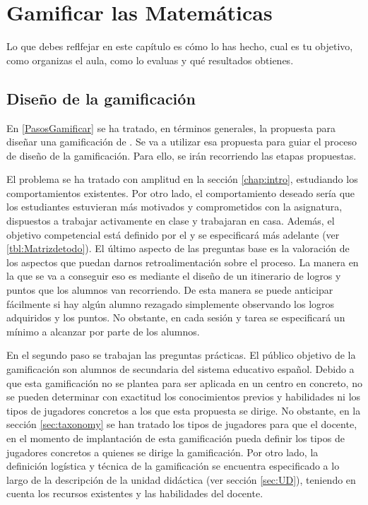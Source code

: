 
\newcommand{\arab}{al-Karaji}
\newcommand{\Arab}{Al-Karaji}
\newcommand{\logro}[2]{\labeltext{#1\xspace}{logro::#2} #1\xspace}


\chapter{Gamificar las Matemáticas}

Lo que debes reflfejar en este capítulo es cómo lo has hecho, cual es tu objetivo, como organizas el aula, como lo evaluas y qué resultados obtienes.



\section{Diseño de la gamificación}

En \ref{PasosGamificar} se ha tratado, en términos generales, la propuesta para diseñar una gamificación de \cite{kapp2013gamification}. 
%
Se va a utilizar esa propuesta para guiar el proceso de diseño de la gamificación. 
%
Para ello, se irán recorriendo las etapas propuestas.

El problema se ha tratado con amplitud en la sección \ref{chap:intro}, estudiando los comportamientos existentes. 
%
Por otro lado, el comportamiento deseado sería que los estudiantes estuvieran más motivados y comprometidos con la asignatura, dispuestos a trabajar activamente en clase y trabajaran en casa.
%
Además, el objetivo competencial está definido por el \bocm y se especificará más adelante (ver \ref{tbl:Matrizdetodo}).
%
\bocmfalse
%
El último aspecto de las preguntas base es la valoración de los aspectos que puedan darnos retroalimentación sobre el proceso.
%
La manera en la que se va a conseguir eso es mediante el diseño de un itinerario de logros y puntos que los alumnos van recorriendo.
%
De esta manera se puede anticipar fácilmente si hay algún alumno rezagado simplemente observando los logros adquiridos y los puntos.
%
No obstante, en cada sesión y tarea se especificará un mínimo a alcanzar por parte de los alumnos.

En el segundo paso se trabajan las preguntas prácticas.
%
El público objetivo de la gamificación son alumnos de secundaria del sistema educativo español. 
%
Debido a que esta gamificación no se plantea para ser aplicada en un centro en concreto, no se pueden determinar con exactitud los conocimientos previos y habilidades ni los tipos de jugadores concretos a los que esta propuesta se dirige.
%
No obstante, en la sección \ref{sec:taxonomy} se han tratado los tipos de jugadores para que el docente, en el momento de implantación de esta gamificación pueda definir los tipos de jugadores concretos a quienes se dirige la gamificación.
%
Por otro lado, la definición logística y técnica de la gamificación se encuentra especificado a lo largo de la descripción de la unidad didáctica (ver sección \ref{sec:UD}), teniendo en cuenta los recursos existentes y las habilidades del docente.

